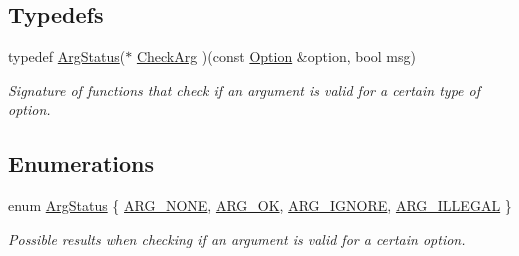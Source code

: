 \subsection*{Typedefs}
\begin{DoxyCompactItemize}
\item 
typedef \hyperlink{namespace_option_parser_ad237d47d58c66dea8dcf4f53ac11a6e4}{Arg\-Status}($\ast$ \hyperlink{namespace_option_parser_aee9955553cc70fd9fd41849622680c6a}{Check\-Arg} )(const \hyperlink{class_option_parser_1_1_option}{Option} \&option, bool msg)
\begin{DoxyCompactList}\small\item\em Signature of functions that check if an argument is valid for a certain type of option. \end{DoxyCompactList}\end{DoxyCompactItemize}
\subsection*{Enumerations}
\begin{DoxyCompactItemize}
\item 
enum \hyperlink{namespace_option_parser_ad237d47d58c66dea8dcf4f53ac11a6e4}{Arg\-Status} \{ \hyperlink{namespace_option_parser_ad237d47d58c66dea8dcf4f53ac11a6e4aa0252a15440f250056ca9cb027b64d0f}{A\-R\-G\-\_\-\-N\-O\-N\-E}, 
\hyperlink{namespace_option_parser_ad237d47d58c66dea8dcf4f53ac11a6e4a30360cae1c7e0b0230dc5cca30aaad4e}{A\-R\-G\-\_\-\-O\-K}, 
\hyperlink{namespace_option_parser_ad237d47d58c66dea8dcf4f53ac11a6e4ac257078e3f7d80eaade706aa9a774b9c}{A\-R\-G\-\_\-\-I\-G\-N\-O\-R\-E}, 
\hyperlink{namespace_option_parser_ad237d47d58c66dea8dcf4f53ac11a6e4a6ea016ff6334ed0d2ec885e96a76c472}{A\-R\-G\-\_\-\-I\-L\-L\-E\-G\-A\-L}
 \}
\begin{DoxyCompactList}\small\item\em Possible results when checking if an argument is valid for a certain option. \end{DoxyCompactList}\end{DoxyCompactItemize}
